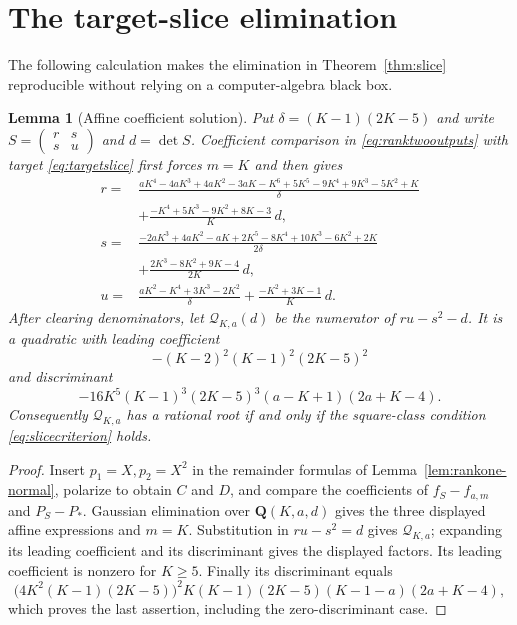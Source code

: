 \documentclass[11pt,reqno]{amsart}
\newtheorem{lemma}[theorem]{Lemma}
\theoremstyle{definition}
\theoremstyle{remark}
\newcommand{\Q}{\mathbf Q}
\begin{document}
\appendix

\section{The target-slice elimination}\label{app:sliceelimination}

The following calculation makes the elimination in
Theorem~\ref{thm:slice} reproducible without relying on a computer-algebra
black box.

\begin{lemma}[Affine coefficient solution]\label{lem:sliceelimination}
Put $\delta=(K-1)(2K-5)$ and write
$S=\left(\begin{smallmatrix}r&s\\s&u\end{smallmatrix}\right)$ and
$d=\det S$.  Coefficient comparison in \eqref{eq:ranktwooutputs} with target
\eqref{eq:targetslice} first forces $m=K$ and then gives
\begin{align*}
r={}&\frac{aK^4-4aK^3+4aK^2-3aK-K^6+5K^5-9K^4+9K^3-5K^2+K}
 {\delta}\\
&+\frac{-K^4+5K^3-9K^2+8K-3}{K}\,d,\\
s={}&\frac{-2aK^3+4aK^2-aK+2K^5-8K^4+10K^3-6K^2+2K}
 {2\delta}\\
&+\frac{2K^3-8K^2+9K-4}{2K}\,d,\\
u={}&\frac{aK^2-K^4+3K^3-2K^2}{\delta}
 +\frac{-K^2+3K-1}{K}\,d.
\end{align*}
After clearing denominators, let $\mathcal Q_{K,a}(d)$ be the numerator of
$ru-s^2-d$.  It is a quadratic with leading coefficient
\[
 -(K-2)^2(K-1)^2(2K-5)^2
\]
and discriminant
\[
 -16K^5(K-1)^3(2K-5)^3
 (a-K+1)(2a+K-4).
\]
Consequently $\mathcal Q_{K,a}$ has a rational root if and only if the
square-class condition \eqref{eq:slicecriterion} holds.
\end{lemma}

\begin{proof}
Insert $p_1=X,p_2=X^2$ in the remainder formulas of
Lemma~\ref{lem:rankone-normal}, polarize to obtain $C$ and $D$, and compare
the coefficients of $f_S-f_{a,m}$ and $P_S-P_*$.  Gaussian elimination over
$\Q(K,a,d)$ gives the three displayed affine expressions and $m=K$.
Substitution in $ru-s^2=d$ gives $\mathcal Q_{K,a}$; expanding its leading
coefficient and its discriminant gives the displayed factors.  Its leading
coefficient is nonzero for $K\ge5$.  Finally its discriminant equals
\[
 \bigl(4K^2(K-1)(2K-5)\bigr)^2
 K(K-1)(2K-5)(K-1-a)(2a+K-4),
\]
which proves the last assertion, including the zero-discriminant case.
\end{proof}
\end{document}
